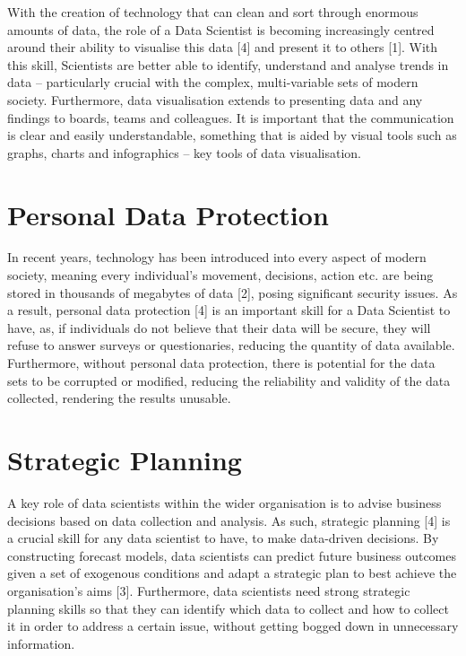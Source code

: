\documentclass[a4paper, 11pt]{report}
\begin{document}
With the creation of technology that can clean and sort through enormous amounts of data, the role of a Data Scientist is becoming increasingly centred around their ability to visualise this data [4] and present it to others [1]. With this skill, Scientists are better able to identify, understand and analyse trends in data – particularly crucial with the complex, multi-variable sets of modern society. Furthermore, data visualisation extends to presenting data and any findings to boards, teams and colleagues. It is important that the communication is clear and easily understandable, something that is aided by visual tools such as graphs, charts and infographics – key tools of data visualisation.


\section*{Personal Data Protection}

In recent years, technology has been introduced into every aspect of modern society, meaning every individual’s movement, decisions, action etc. are being stored in thousands of megabytes of data [2], posing significant security issues. As a result, personal data protection [4] is an important skill for a Data Scientist to have, as, if individuals do not believe that their data will be secure, they will refuse to answer surveys or questionaries, reducing the quantity of data available. Furthermore, without personal data protection, there is potential for the data sets to be corrupted or modified, reducing the reliability and validity of the data collected, rendering the results unusable.


\section*{Strategic Planning}

A key role of data scientists within the wider organisation is to advise business decisions based on data collection and analysis. As such, strategic planning [4] is a crucial skill for any data scientist to have, to make data-driven decisions. By constructing forecast models, data scientists can predict future business outcomes given a set of exogenous conditions and adapt a strategic plan to best achieve the organisation’s aims [3]. Furthermore, data scientists need strong strategic planning skills so that they can identify which data to collect and how to collect it in order to address a certain issue, without getting bogged down in unnecessary information.
\end{document}
